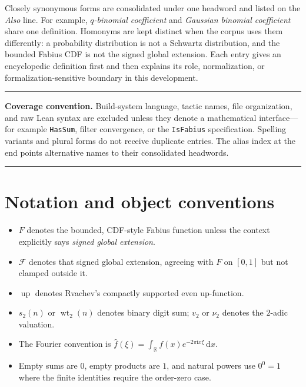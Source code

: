 \documentclass[11pt,oneside]{article}
\theoremstyle{definition}
\theoremstyle{remark}
\newcommand{\R}{\mathbb R}
\newcommand{\Up}{\operatorname{up}}
\newcommand{\wt}{\operatorname{wt}_2}
\newcommand{\ii}{\mathrm i}
\newcommand{\dd}{\,\mathrm d}
\newenvironment{boxedremark}{%
  \par\smallskip\noindent\begin{center}\begin{minipage}{0.94\textwidth}%
  \color{black}\hrule\vspace{0.6em}\small
}{%
  \vspace{0.6em}\hrule\end{minipage}\end{center}\smallskip
}
\begin{document}
Closely synonymous forms are consolidated under one headword and listed on the
\emph{Also} line.  For example, \emph{$q$-binomial coefficient} and
\emph{Gaussian binomial coefficient} share one definition.  Homonyms are
kept distinct when the corpus uses them differently: a probability distribution
is not a Schwartz distribution, and the bounded Fabius CDF is not the signed
global extension.  Each entry gives an encyclopedic definition first and then
explains its role, normalization, or formalization-sensitive boundary in this
development.

\begin{boxedremark}
\textbf{Coverage convention.}  Build-system language, tactic names, file
organization, and raw Lean syntax are excluded unless they denote a mathematical
interface---for example \texttt{HasSum}, filter convergence, or the
\texttt{IsFabius} specification.  Spelling variants and plural forms do not
receive duplicate entries.  The alias index at the end points alternative names
to their consolidated headwords.
\end{boxedremark}

\section*{Notation and object conventions}
\begin{itemize}
  \item $F$ denotes the bounded, CDF-style Fabius function unless the context
        explicitly says \emph{signed global extension}.
  \item $\mathcal F$ denotes that signed global extension, agreeing with $F$ on
        $[0,1]$ but not clamped outside it.
  \item $\Up$ denotes Rvachev's compactly supported even up-function.
  \item $s_2(n)$ or $\wt(n)$ denotes binary digit sum; $v_2$ or $\nu_2$ denotes
        the $2$-adic valuation.
  \item The Fourier convention is
        $\widehat f(\xi)=\int_\R f(x)e^{-2\pi\ii x\xi}\dd x$.
  \item Empty sums are $0$, empty products are $1$, and natural powers use
        $0^0=1$ where the finite identities require the order-zero case.
\end{itemize}
\end{document}
